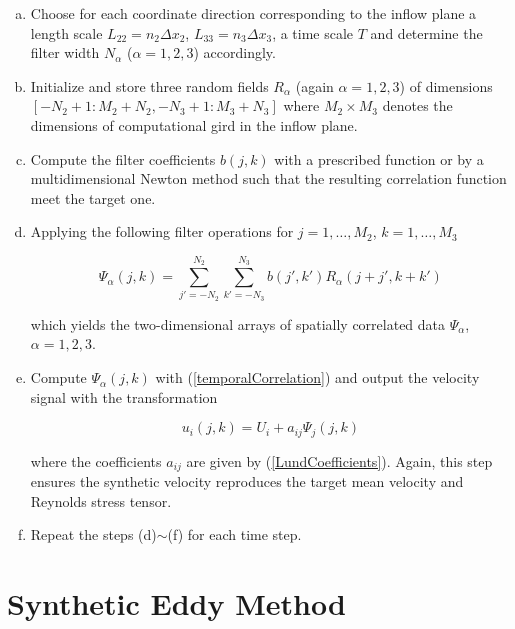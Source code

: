 \begin{enumerate}[(a)]

\item Choose for each coordinate direction corresponding to the inflow plane a length scale $L_{22} = n_2\Delta x_2$, $L_{33} = n_3\Delta x_3$, a time scale $T$ and determine the filter width $N_{\alpha}$ ($\alpha = 1,2,3$) accordingly.

\item Initialize and store three random fields $R_{\alpha}$ (again $\alpha =1,2,3$) of dimensions $[-N_2+1:M_2+N_2,-N_3+1:M_3+N_3]$ where $M_2 \times M_3$ denotes the dimensions of computational gird in the inflow plane.

\item Compute the filter coefficients $b(j,k)$ with a prescribed function or by a multidimensional Newton method such that the resulting correlation function meet the target one.

\item Applying the following filter operations for $j=1,\ldots,M_2$, $k=1,\ldots,M_3$

\begin{equation}
\varPsi_{\alpha}(j,k) = \sum_{j'=-N_2}^{N_2}\sum_{k'=-N_3}^{N_3}b(j',k')R_{\alpha}(j+j',k+k')
\end{equation}

\noindent which yields the two-dimensional arrays of spatially correlated data $\varPsi_{\alpha}$, $\alpha =1,2,3$.

\item Compute $\Psi_{\alpha}(j,k)$ with (\ref{temporalCorrelation}) and output the velocity signal with the transformation

\begin{equation}
u_i(j,k) = U_i + a_{ij}\Psi_j(j,k)
\end{equation}

\noindent where the coefficients $a_{ij}$ are given by (\ref{LundCoefficients}). Again, this step ensures the synthetic velocity reproduces the target mean velocity and Reynolds stress tensor.

\item Repeat the steps (d)$\sim$(f) for each time step.

\end{enumerate}


\section{Synthetic Eddy Method}\label{sectionSEM}

